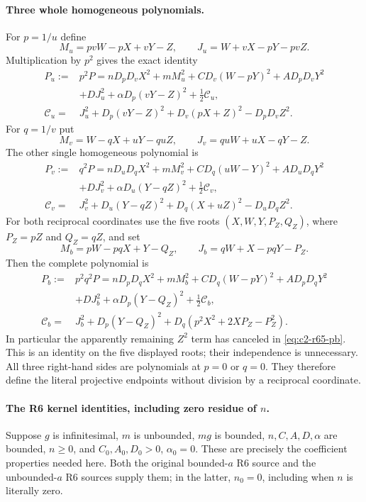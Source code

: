 \paragraph{Three whole homogeneous polynomials.}
For $p=1/u$ define
\[
 M_u=pvW-pX+vY-Z,\qquad J_u=W+vX-pY-pvZ.
\]
Multiplication by $p^2$ gives the exact identity
\begin{equation}\label{eq:c2-r65-pu}
\begin{split}
 P_u:={}&p^2P
 =nD_pD_vX^2+mM_u^2+CD_v(W-pY)^2+AD_pD_vY^2\\
 &+DJ_u^2+\alpha D_p(vY-Z)^2+\tfrac12\mathcal C_u,\\
 \mathcal C_u={}&J_u^2+D_p(vY-Z)^2+D_v(pX+Z)^2-D_pD_vZ^2.
\end{split}
\end{equation}
For $q=1/v$ put
\[
 M_v=W-qX+uY-quZ,\qquad J_v=quW+uX-qY-Z.
\]
The other single homogeneous polynomial is
\begin{equation}\label{eq:c2-r65-pv}
\begin{split}
 P_v:={}&q^2P
 =nD_uD_qX^2+mM_v^2+CD_q(uW-Y)^2+AD_uD_qY^2\\
 &+DJ_v^2+\alpha D_u(Y-qZ)^2+\tfrac12\mathcal C_v,\\
 \mathcal C_v={}&J_v^2+D_u(Y-qZ)^2+D_q(X+uZ)^2-D_uD_qZ^2.
\end{split}
\end{equation}
For both reciprocal coordinates use the five roots
$(X,W,Y,P_Z,Q_Z)$, where $P_Z=pZ$ and $Q_Z=qZ$, and set
\[
 M_b=pW-pqX+Y-Q_Z,\qquad J_b=qW+X-pqY-P_Z.
\]
Then the complete polynomial is
\begin{equation}\label{eq:c2-r65-pb}
\begin{split}
 P_b:={}&p^2q^2P
 =nD_pD_qX^2+mM_b^2+CD_q(W-pY)^2+AD_pD_qY^2\\
 &+DJ_b^2+\alpha D_p(Y-Q_Z)^2+\tfrac12\mathcal C_b,\\
 \mathcal C_b={}&J_b^2+D_p(Y-Q_Z)^2
                  +D_q(p^2X^2+2XP_Z-P_Z^2).
\end{split}
\end{equation}
In particular the apparently remaining $Z^2$ term has canceled in
\eqref{eq:c2-r65-pb}. This is an identity on the five displayed roots;
their independence is unnecessary. All three right-hand sides are
polynomials at $p=0$ or $q=0$. They therefore define the literal
projective endpoints without division by a reciprocal coordinate.

\paragraph{The R6 kernel identities, including zero residue of $n$.}
Suppose $g$ is infinitesimal, $m$ is unbounded, $mg$ is bounded,
$n,C,A,D,\alpha$ are bounded, $n\ge0$, and
$C_0,A_0,D_0>0$, $\alpha_0=0$. These are precisely the coefficient
properties needed here. Both the original bounded-$a$ R6 source
and the unbounded-$a$ R6 sources supply them; in the latter,
$n_0=0$, including when $n$ is literally zero.

